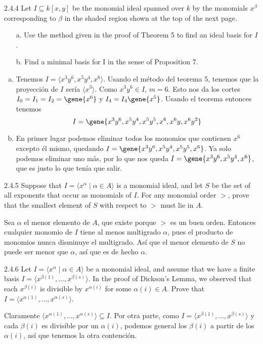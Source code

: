 \documentclass[twoside]{article}
\begin{document}
\newpage

\begin{ejercicio}{2.4.4}
Let $I ⊆ k[x, y]$ be the monomial ideal spanned over $k$ by the monomials $x^{β}$ corresponding
to $β$ in the shaded region shown at the top of the next page.
\begin{enumerate}
\item[a.] Use the method given in the proof of Theorem 5 to find an ideal basis for $I$.
\item[b.] Find a minimal basis for I in the sense of Proposition 7.
\end{enumerate}
\end{ejercicio}
\begin{solucion}
\begin{enumerate}[a.]
\item Tenemos $I=\langle x^3y^6,x^5y^4, x^6\rangle$. Usando el método del teorema 5, tenemos que la proyección de $I$ sería $\langle x^3\rangle$. Como $x^3y^6\in I$, $m=6$. Esto nos da los cortes $I_0=I_1=I_2=\gene{x^6}$ y $I_4=I_4\gene{x^5}$. Usando el teorema entonces tenemos $$I=\gene{ x^3y^6,x^5y^4,x^5y^5, x^6,x^6y, x^6y^2}$$
\item En primer lugar podemos eliminar todos los monomios que contienen $x^6$ excepto él mismo, quedando $I=\gene{ x^3y^6,x^5y^4,x^5y^5, x^6}$. Ya solo podemos eliminar uno más, por lo que nos queda $I=\gene{ x^3y^6,x^5y^4, x^6}$, que es justo lo que tenía que salir.
\end{enumerate}
\end{solucion}
\newpage

\begin{ejercicio}{2.4.5}
Suppose that $I =\langle 
x^{α} \mid α ∈ A\rangle$ is a monomial ideal, and let $S$ be the set of all exponents
that occur as monomials of $I$. For any monomial order $>$, prove that the smallest element
of $S$ with respect to $>$ must lie in $A$.
\end{ejercicio}
\begin{solucion}
Sea $\alpha$ el menor elemento de $A$, que existe porque $>$ es un buen orden. Entonces cualquier monomio de $I$ tiene al menos multigrado $\alpha$, pues el producto de monomios nunca disminuye el multigrado. Así que el menor elemento de $S$ no puede ser menor que $\alpha$, así que es de hecho $\alpha$.
\end{solucion}

\newpage

\begin{ejercicio}{2.4.6}
Let $I =\langle 
x^{α} \mid α ∈ A\rangle$ be a monomial ideal, and assume that we have a finite basis
$I =\langle 
x^{β(1)},\dots , x^{β(s)}\rangle$. In the proof of Dickson’s Lemma, we observed that each $x^{β(i)}$ is
divisible by $x^{α(i)}$ for some $α(i) ∈ A$. Prove that $I =\langle 
x^{α(1)},\dots , x^{α(s)}\rangle$.
\end{ejercicio}
\begin{solucion}
Claramente $\langle 
x^{α(1)},\dots , x^{α(s)}\rangle\subseteq I$. Por otra parte, como $I=\langle 
x^{β(1)},\dots , x^{β(s)}\rangle$ y cada $\beta(i)$ es divisible por un $\alpha(i)$, podemos general los $\beta(i)$ a partir de los $\alpha(i)$, así que tenemos la otra contención.
\end{solucion}
\end{document}
